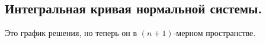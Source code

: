 \subsection*{Интегральная кривая нормальной системы.}

Это график решения, но теперь он в \((n + 1)\)-мерном пространстве.










